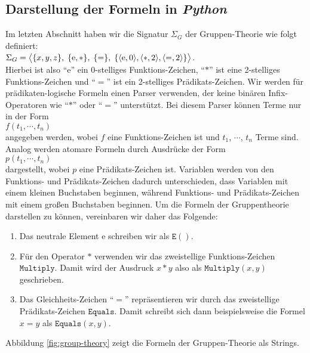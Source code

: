\subsection{Darstellung der Formeln in \textsl{Python}}
Im letzten Abschnitt haben wir die Signatur $\Sigma_G$ der
Gruppen-Theorie wie folgt definiert:
\\[0.2cm]
\hspace*{1.3cm}
$\Sigma_G = 
   \bigl\langle \{x,y,z\},\; \{\mathrm{e},*\},\; \{=\},\; \{ \pair(\mathrm{e},0), \pair(*,2), \pair(=,2) \} \bigr\rangle 
$.
\\[0.2cm]
Hierbei ist also ``$\mathrm{e}$'' ein 0-stelliges Funktions-Zeichen, ``$*$'' ist
eine 2-stelliges Funktions-Zeichen und ``$=$'' ist ein 2-stelliges Prädikats-Zeichen.
Wir werden für prädikaten-logische Formeln einen Parser verwenden, der keine binären Infix-Operatoren wie
``$*$'' oder ``$=$'' unterstützt.  Bei diesem Parser können Terme nur in der Form
\\[0.2cm]
\hspace*{1.3cm}
$f(t_1,\cdots,t_n)$
\\[0.2cm]
angegeben werden, wobei $f$ eine Funktions-Zeichen ist und $t_1$, $\cdots$, $t_n$ Terme sind.  Analog werden
atomare Formeln durch Ausdrücke der Form
\\[0.2cm]
\hspace*{1.3cm}
$p(t_1,\cdots,t_n)$
\\[0.2cm]
dargestellt, wobei $p$ eine Prädikats-Zeichen ist.  Variablen werden von den Funktions- und Prädikats-Zeichen
dadurch unterschieden, dass Variablen mit einem kleinen Buchstaben beginnen, während Funktions- und
Prädikats-Zeichen mit einem großen Buchstaben beginnen.  Um die Formeln der Gruppentheorie darstellen zu
können, vereinbaren wir daher das Folgende:
\begin{enumerate}
\item Das neutrale Element $\mathrm{e}$ schreiben wir als $\texttt{E}()$.  
\item Für den Operator $*$ verwenden wir das zweistellige Funktions-Zeichen $\texttt{Multiply}$.
      Damit wird der Ausdruck $x*y$ also als $\texttt{Multiply}(x, y)$ geschrieben.
\item Das Gleichheits-Zeichen ``$=$'' repräsentieren wir durch das zweistellige Prädikats-Zeichen
      $\texttt{Equals}$.  Damit schreibt sich dann beispielsweise die Formel $x = y$ als $\texttt{Equals}(x, y)$.
\end{enumerate}
Abbildung \ref{fig:group-theory} zeigt die Formeln der Gruppen-Theorie als Strings.

